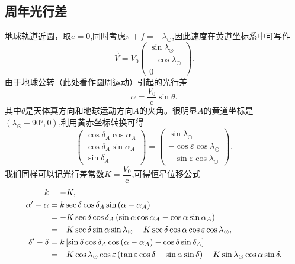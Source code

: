 \documentclass[11pt, a4paper, oneside]{ctexart}
\numberwithin{equation}{subsection}
\begin{document}
\subsection{周年光行差}
地球轨道近圆，取$e=0$,同时考虑$\pi+f=-\lambda_{\odot}$,因此速度在黄道坐标系中可写作
\begin{equation}
\vec{V}=V_{0}\begin{pmatrix}
\sin\lambda_{\odot}\\
-\cos\lambda_{\odot}\\
0
\end{pmatrix}.
\end{equation}
由于地球公转（此处看作圆周运动）引起的光行差
\begin{equation}
\alpha=\frac{V_{0}}{\mathrm{c}}\sin\theta.
\end{equation}
其中$\theta$是天体真方向和地球运动方向$A$的夹角。很明显$A$的黄道坐标是$\left(\lambda_{\odot}-\ang{90;;},0\right)$,利用黄赤坐标转换可得
\begin{equation}
\begin{pmatrix}
\cos\delta_A\cos\alpha_A\\
\cos\delta_A\sin\alpha_A\\
\sin\delta_A
\end{pmatrix}=\begin{pmatrix}
\sin\lambda_\odot\\
-\cos\varepsilon\cos\lambda_\odot\\
-\sin\varepsilon\cos\lambda_\odot
\end{pmatrix}.
\end{equation}
我们同样可以记光行差常数$K=\dfrac{V_{0}}{\mathrm{c}}$,可得恒星位移公式
\begin{align}
k&=-K,\\
\alpha'-\alpha&=k\sec\delta\cos\delta_A\sin\left(\alpha-\alpha_A\right)\notag\\
&=-K\sec\delta\cos\delta_A\left(\sin\alpha\cos\alpha_A-\cos\alpha\sin\alpha_A\right)\notag\\
&=-K\sec\delta\sin\alpha\sin\lambda_\odot-K\sec\delta\cos\alpha\cos\varepsilon\cos\lambda_\odot,\\
\delta'-\delta&=k\left[\sin\delta\cos\delta_A\cos\left(\alpha-\alpha_A\right)-\cos\delta\sin\delta_A\right]\notag\\
&=-K\cos\lambda_\odot\cos\varepsilon\left(\tan\varepsilon\cos\delta-\sin\alpha\sin\delta\right)-K\sin\lambda_\odot\cos\alpha\sin\delta.
\end{align}
\end{document}
